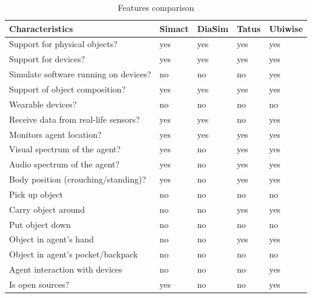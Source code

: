 \begin{table}[H]
	\begin{center}
		\small \begin{tabular*}{1.1\columnwidth}{lllll}
			\\ \hline \hline
			Characteristics & Simact & DiaSim & Tatus & Ubiwise \\ \hline \hline

			Support for physical objects? & yes & yes & yes & yes \\ \hline
			Support for devices? & yes & yes & yes & yes \\ \hline
			Simulate software running on devices? & no & no & no & yes \\ \hline
			Support of object composition? & yes & yes & yes & yes \\ \hline
			Wearable devices? & no & no & no & no \\ \hline
			Receive data from real-life sensors? & yes & yes & no & yes \\ \hline

			Monitors agent location? & yes & yes & yes & yes \\ \hline
			Visual spectrum of the agent? & yes & no & yes & yes \\ \hline
			Audio spectrum of the agent? & yes & no & yes & yes \\ \hline
			Body position (crouching/standing)? & yes & no & yes & yes \\ \hline
			Pick up object & no & no & no & no \\ \hline
			Carry object around & no & no & yes & yes \\ \hline
			Put object down & no & no & no & no \\ \hline
			Object in agent's hand & no & no & yes & yes \\ \hline
			Object in agent's pocket/backpack & no & no & no & no \\ \hline

			Agent interaction with devices & no & no & no & yes \\ \hline

			Is open sources?             & yes & no & no & yes \\ \hline
		\end{tabular*}
		
		\caption{Features comparison}
		\label{table:comparison}
	\end{center}
\end{table}
